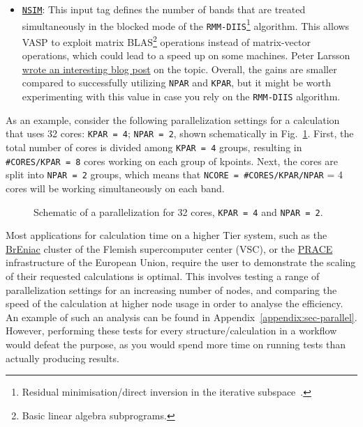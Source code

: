 \begin{refsection}
\begin{itemize}
\item \href{https://cms.mpi.univie.ac.at/wiki/index.php/NSIM}{\texttt{NSIM}}: 
This input tag defines the number of bands that are treated simultaneously in 
the blocked mode of the \texttt{RMM-DIIS}\footnote{Residual minimisation/direct inversion in the iterative subspace~\cite{Wood1985}.} algorithm. This allows VASP 
to exploit matrix BLAS\footnote{Basic linear algebra subprograms.} operations instead of matrix-vector operations, which 
could lead to a speed up on some machines. Peter Larsson 
\href{https://www.nsc.liu.se/~pla/blog/2012/02/22/nparnsim/}{wrote an 
interesting blog post} on the topic. Overall, the gains are smaller compared to 
successfully utilizing \verb|NPAR| and \verb|KPAR|, but it might be worth 
experimenting with this value in case you rely on the \texttt{RMM-DIIS} 
algorithm. 
 
\end{itemize} 
 
As an example, consider the following parallelization settings for a 
calculation that uses 32 cores: \texttt{KPAR = 4}; \texttt{NPAR = 2}, shown 
schematically in Fig.~\ref{automation:fig-parallel}. First, the total number 
of cores is divided among \texttt{KPAR = 4} groups, resulting in 
\texttt{\#CORES/KPAR = 8} cores working on each group of kpoints. Next, the 
cores are split into \texttt{NPAR = 2} groups, which means that \texttt{NCORE 
= \#CORES/KPAR/NPAR} = 4 cores will be working simultaneously on each band. 
 
\begin{figure}[hb] 
\centering 
 
\caption{Schematic of a parallelization for 32 cores, \texttt{KPAR = 4}  and 
\texttt{NPAR = 2}.} 
\label{automation:fig-parallel} 
\end{figure} 
 
Most applications for calculation time on a higher Tier system, such as the 
\href{https://www.vscentrum.be/tier1}{BrEniac} cluster of the Flemish supercomputer center (VSC), or the 
\href{http://www.prace-ri.eu/}{PRACE} infrastructure of the European Union, 
require the user to demonstrate the scaling of their requested calculations is 
optimal. This involves testing a range of parallelization settings for an 
increasing number of nodes, and comparing the speed of the calculation at 
higher node usage in order to analyse the efficiency. An example of such an 
analysis can be found in Appendix~\ref{appendix:sec-parallel}. However, 
performing these tests for every structure/calculation in a workflow would 
defeat the purpose, as you would spend more time on running tests than 
actually producing results.  
 

\end{refsection}
